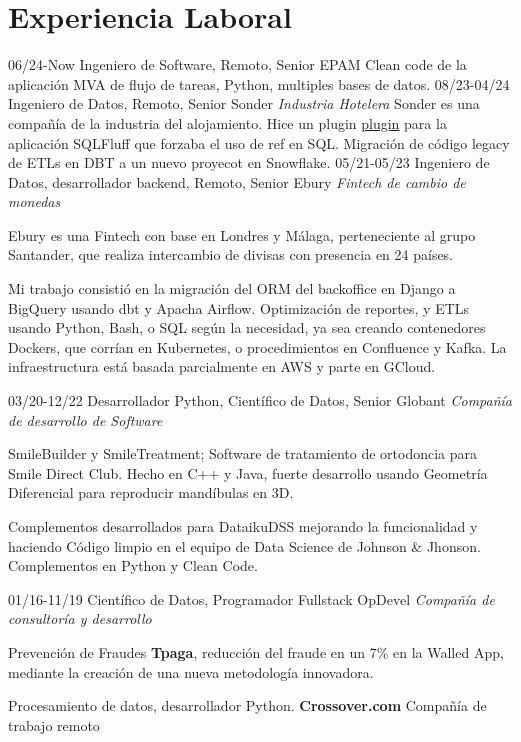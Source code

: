 \section{Experiencia Laboral}

\begin{entrylist}
  \entry
    {06/24-Now}
    {Ingeniero de Software, Remoto, Senior}
    {EPAM}
    {Clean code de la aplicación MVA de flujo de tareas, Python, multiples bases de datos.}
  \entry
    {08/23-04/24}
    {Ingeniero de Datos, Remoto, Senior}
    {Sonder {\sl Industria Hotelera}}
        {Sonder es una compañía de la industria del alojamiento. Hice un plugin \href{http:\\https://github.com/juanfejara/sqlfluff-templ-check}{plugin} para la aplicación SQLFluff que forzaba el uso de ref en SQL.
	Migración de código legacy de ETLs en DBT a un nuevo proyecot en Snowflake.}
  \entry
    {05/21-05/23}
    {Ingeniero de Datos, desarrollador backend, Remoto, Senior}
    {Ebury {\sl Fintech de cambio de monedas}}
    {Ebury es una Fintech con base en Londres y Málaga, perteneciente al grupo Santander, que realiza intercambio de divisas con presencia en 24 países.

Mi trabajo consistió en la migración del ORM del backoffice en Django a BigQuery usando dbt y Apacha Airflow. Optimización de reportes, y ETLs usando Python, Bash, o SQL según la necesidad, ya sea creando contenedores Dockers, que corrían en Kubernetes, o procedimientos en Confluence y Kafka. La infraestructura está basada parcialmente en AWS y parte en GCloud.}
	\entry

    {03/20-12/22}
    {Desarrollador Python, Científico de Datos, Senior}
    {Globant {\sl Compañía de desarrollo de Software}}
	{SmileBuilder y SmileTreatment; Software de tratamiento de ortodoncia para Smile Direct Club. Hecho en C++ y Java,
fuerte desarrollo usando Geometría Diferencial para reproducir mandíbulas en 3D.

Complementos desarrollados para DataikuDSS mejorando la funcionalidad y haciendo
Código limpio en el equipo de Data Science de Johnson \& Jhonson. Complementos en Python y Clean Code.}
  \entry
    {01/16-11/19}
    {Científico de Datos, Programador Fullstack}
    {OpDevel {\sl Compañía de consultoría y desarrollo}}
    {Prevención de Fraudes \textbf{Tpaga}, reducción del fraude en un 7\% en la Walled App, mediante la
creación de una nueva metodología innovadora.

Procesamiento de datos, desarrollador Python. \textbf{Crossover.com} Compañía de trabajo remoto

}
\end{entrylist}

